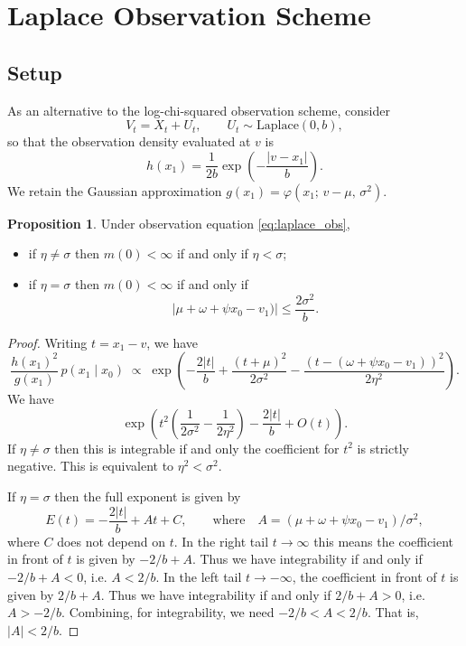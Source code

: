 \documentclass[11pt,reqno]{amsart}
\renewcommand{\phi}{\varphi}
\theoremstyle{definition}
\newtheorem{prop}[thm]{Proposition}
\begin{document}



\section{Laplace Observation Scheme}

\subsection{Setup}

As an alternative to the log-chi-squared observation scheme, consider
\begin{equation}\label{eq:laplace_obs}
  V_t = X_t + U_t, \qquad U_t \sim \mathrm{Laplace}(0, b),
	\end{equation}
so that the observation density evaluated at $v$ is
\[
  h(x_1) = \frac{1}{2b}\exp\!\left(-\frac{|v - x_1|}{b}\right).
\]
We retain the Gaussian approximation $g(x_1) = \phi(x_1;\, v-\mu,\, \sigma^2)$.
\begin{prop}
Under observation equation \eqref{eq:laplace_obs}, \begin{itemize}
	\item if $\eta\neq \sigma$ then $m(0)<\infty$ if and only if $\eta < \sigma$;
	\item if $\eta=\sigma$ then $m(0)<\infty$ if and only if 
\[ \left| \mu+\omega+ \psi x_0-v_1)\right| \le \frac{2\sigma^2}{b}. \]
\end{itemize}
\end{prop}
\begin{proof} 
	Writing $t = x_1 - v$, we have 
\[
  \frac{h(x_1)^2}{g(x_1)}\,p(x_1\mid x_0)
  \;\propto\;
  \exp\!\left(
    -\frac{2|t|}{b}
    + \frac{(t+\mu)^2}{2\sigma^2}
    - \frac{(t - (\omega+\psi x_0 - v_1))^2}{2\eta^2}
  \right).
\]
We have \[
  \exp\!\left(t^2\!\left(\frac{1}{2\sigma^2}-\frac{1}{2\eta^2}\right)
    - \frac{2|t|}{b} + O(t)\right).
\]
If $\eta \neq \sigma$ then this is integrable if and only the coefficient for $t^2$ is strictly negative. This is equivalent to $\eta^2 < \sigma^2$. 

If $\eta = \sigma$ then the full exponent is given by
\[ E(t) = -\frac{2|t|}{b} + A t + C, \qquad \text{where}\quad A = (\mu+\omega+ \psi x_0-v_1)/\sigma^2, \] where $C$ does not depend on $t$. 
In the right tail $t\to \infty$ this means the coefficient in front of $t$ is given by $-2/b+A$. Thus we have integrability if and only if $-2/b+A<0$, i.e.
 $A<2/b$. In the left tail $t\to -\infty$, the coefficient in front of $t$ is given by $2/b+A$. 
Thus we have integrability if and only if $2/b+A>0$, i.e.
 $A>-2/b$. Combining, for integrability, we need $-2/b<A<2/b$. That is, $|A|<2/b$. 
\end{proof}
\end{document}
